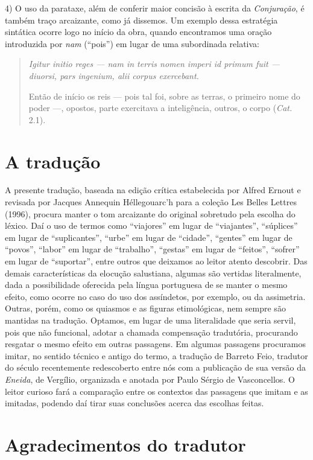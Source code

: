4) O uso da parataxe, além de conferir maior concisão à escrita da \emph{Conjuração},
é também traço arcaizante, como já dissemos. Um exemplo dessa estratégia
sintática ocorre logo no início da obra, quando encontramos uma oração
introduzida por \emph{nam} (“pois”) em lugar de uma subordinada relativa:
\begin{quote} \emph{Igitur initio reges --- nam in terris nomen imperi id primum
  fuit --- diuorsi, pars ingenium, alii corpus exercebant.}

Então de início os reis --- pois tal foi, sobre as terras, o primeiro nome do
poder ---, opostos, parte exercitava a inteligência, outros, o corpo (\emph{Cat.} 2.1).
\end{quote}

\section{A tradução}

 A presente tradução, baseada na edição crítica estabelecida por Alfred Ernout e revisada por Jacques Annequin Héllegouarc'h para a coleção
 Les Belles Lettres (1996), procura manter o tom arcaizante do original
 sobretudo pela escolha do léxico. Daí o uso de termos como “viajores” em lugar
 de “viajantes”, “súplices” em lugar de “suplicantes”, “urbe” em lugar de
 “cidade”, “gentes” em lugar de “povos”, “labor” em lugar de “trabalho”,
 “gestas” em lugar de “feitos”, “sofrer” em lugar de “suportar”, entre outros
 que deixamos ao leitor atento descobrir.  Das demais características da
 elocução salustiana, algumas são vertidas literalmente, dada a possibilidade
 oferecida pela língua portuguesa de se manter o mesmo efeito, como ocorre no
 caso do uso dos assíndetos, por exemplo, ou da assimetria. Outras, porém, como os quiasmos e as figuras
 etimológicas, nem sempre são mantidas na tradução. Optamos, em lugar de uma
 literalidade que seria servil, pois que não funcional, adotar a chamada
 compensação tradutória, procurando resgatar o mesmo efeito em outras
 passagens.  Em algumas passagens procuramos imitar, no sentido técnico
 e antigo do termo, a tradução de Barreto Feio, tradutor do século 
 recentemente redescoberto entre nós com a publicação de sua versão da \emph{Eneida},
 de Vergílio, organizada e anotada por Paulo Sérgio de Vasconcellos. O leitor
 curioso fará a comparação entre os contextos das passagens que imitam e as
 imitadas, podendo daí tirar suas conclusões acerca das escolhas feitas. 

\section{Agradecimentos do tradutor}

